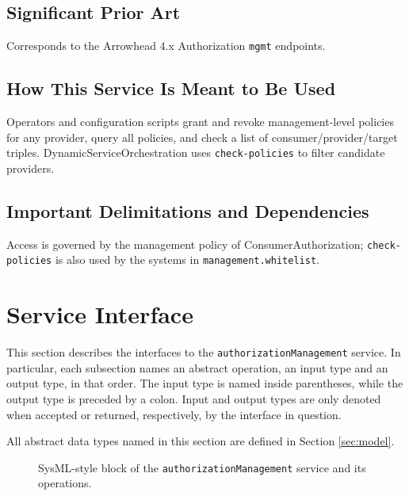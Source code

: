 \documentclass[a4paper]{arrowhead}
\begin{document}
\subsection{Significant Prior Art}

Corresponds to the Arrowhead 4.x Authorization \texttt{mgmt} endpoints.

\subsection{How This Service Is Meant to Be Used}

Operators and configuration scripts grant and revoke management-level policies for any provider, query all policies, and check a list of consumer/provider/target triples. Dynamic\allowbreak{}Service\allowbreak{}Orchestration uses \texttt{check-\allowbreak{}policies} to filter candidate providers.

\subsection{Important Delimitations and Dependencies}
\label{sec:delimitations}

Access is governed by the management policy of Consumer\allowbreak{}Authorization; \texttt{check-\allowbreak{}policies} is also used by the systems in \texttt{management.\allowbreak{}whitelist}.

\newpage

\section{Service Interface}
\label{sec:operations}

This section describes the interfaces to the \texttt{authorization\allowbreak{}Management} service.
In particular, each subsection names an abstract operation, an input type and an output type, in that order.
The input type is named inside parentheses, while the output type is preceded by a colon.
Input and output types are only denoted when accepted or returned, respectively, by the interface in question.

All abstract data types named in this section are defined in Section \ref{sec:model}.

\begin{figure}[ht!]
  \centering
  \caption{SysML-style block of the \texttt{authorization\allowbreak{}Management} service and its operations.}
  \label{fig:SD}
\end{figure}
\end{document}
